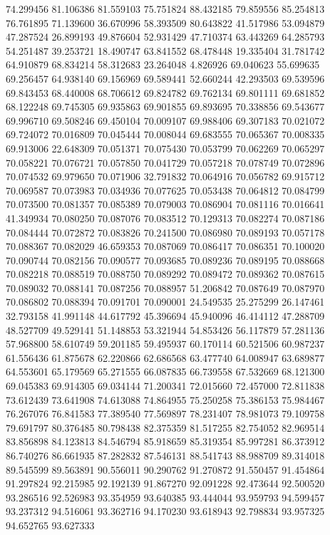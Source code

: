 74.299456
81.106386
81.559103
75.751824
88.432185
79.859556
85.254813
76.761895
71.139600
36.670996
58.393509
80.643822
41.517986
53.094879
47.287524
26.899193
49.876604
52.931429
47.710374
63.443269
64.285793
54.251487
39.253721
18.490747
63.841552
68.478448
19.335404
31.781742
64.910879
68.834214
58.312683
23.264048
4.826926
69.040623
55.699635
69.256457
64.938140
69.156969
69.589441
52.660244
42.293503
69.539596
69.843453
68.440008
68.706612
69.824782
69.762134
69.801111
69.681852
68.122248
69.745305
69.935863
69.901855
69.893695
70.338856
69.543677
69.996710
69.508246
69.450104
70.009107
69.988406
69.307183
70.021072
69.724072
70.016809
70.045444
70.008044
69.683555
70.065367
70.008335
69.913006
22.648309
70.051371
70.075430
70.053799
70.062269
70.065297
70.058221
70.076721
70.057850
70.041729
70.057218
70.078749
70.072896
70.074532
69.979650
70.071906
32.791832
70.064916
70.056782
69.915712
70.069587
70.073983
70.034936
70.077625
70.053438
70.064812
70.084799
70.073500
70.081357
70.085389
70.079003
70.086904
70.081116
70.016641
41.349934
70.080250
70.087076
70.083512
70.129313
70.082274
70.087186
70.084444
70.072872
70.083826
70.241500
70.086980
70.089193
70.057178
70.088367
70.082029
46.659353
70.087069
70.086417
70.086351
70.100020
70.090744
70.082156
70.090577
70.093685
70.089236
70.089195
70.088668
70.082218
70.088519
70.088750
70.089292
70.089472
70.089362
70.087615
70.089032
70.088141
70.087256
70.088957
51.206842
70.087649
70.087970
70.086802
70.088394
70.091701
70.090001
24.549535
25.275299
26.147461
32.793158
41.991148
44.617792
45.396694
45.940096
46.414112
47.288709
48.527709
49.529141
51.148853
53.321944
54.853426
56.117879
57.281136
57.968800
58.610749
59.201185
59.495937
60.170114
60.521506
60.987237
61.556436
61.875678
62.220866
62.686568
63.477740
64.008947
63.689877
64.553601
65.179569
65.271555
66.087835
66.739558
67.532669
68.121300
69.045383
69.914305
69.034144
71.200341
72.015660
72.457000
72.811838
73.612439
73.641908
74.613088
74.864955
75.250258
75.386153
75.984467
76.267076
76.841583
77.389540
77.569897
78.231407
78.981073
79.109758
79.691797
80.376485
80.798438
82.375359
81.517255
82.754052
82.969514
83.856898
84.123813
84.546794
85.918659
85.319354
85.997281
86.373912
86.740276
86.661935
87.282832
87.546131
88.541743
88.988709
89.314018
89.545599
89.563891
90.556011
90.290762
91.270872
91.550457
91.454864
91.297824
92.215985
92.192139
91.867270
92.091228
92.473644
92.500520
93.286516
92.526983
93.354959
93.640385
93.444044
93.959793
94.599457
93.237312
94.516061
93.362716
94.170230
93.618943
92.798834
93.957325
94.652765
93.627333
